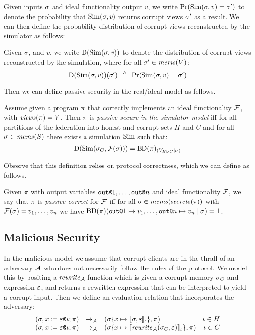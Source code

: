 Given inputs $\sigma$ and ideal
functionality output $v$, we write $ \mathrm{Pr}(\mathrm{Sim}(\sigma,v) = \sigma') $
to denote the probability that $\mathrm{Sim}(\sigma,v)$ returns corrupt views
$\sigma'$ as a result. We can then define the probability distribution
of corrupt views reconstructed by the simulator as follows:
\begin{definition}
  Given $\sigma$, and $v$, we write $\mathrm{D}(\mathrm{Sim}(\sigma,v))$ to
  denote the distribution of corrupt views reconstructed by the
  simulation, where for
  all $\sigma' \in \mathit{mems}(V)$:
  $$
  \dist(\SIM(\store,v))(\store')\ \defeq\ \prob(\SIM(\store,v) = \store') 
  $$
\end{definition}
Then we can define passive security in the real/ideal
model as follows. 
\begin{definition}
  Assume given a program $\pi$ that correctly implements an ideal
  functionality $\mathcal{F}$, with $\mathit{views}(\pi) = V$.  Then $\pi$
  is \emph{passive secure in the simulator model} iff for all
  partitions of the federation into honest and corrupt sets $H$ and $C$
  and for all $\sigma \in \mathit{mems}(S)$ there exists a
  simulation $\mathrm{Sim}$ such that:
  $$
  \mathrm{D}(\mathrm{Sim}(\sigma_{C},\mathcal{F}(\sigma))) = \mathrm{BD}(\pi)_{({V_{H \rhd C}}|{\sigma})}
  $$
\end{definition}
Observe that this definition relies on protocol correctness, which
we can define as follows.
\begin{definition}
  Given $\pi$ with output variables $\texttt{out}\texttt{@}1,\ldots,\texttt{out}\texttt{@}n$ and ideal
  functionality $\mathcal{F}$, we say that $\pi$ is \emph{passive correct}
  for $\mathcal{F}$ iff for all $\sigma \in \mathit{mems}(\mathit{secrets}(\pi))$
  with $\mathcal{F}(\sigma) = v_1,\ldots,v_n$ we have
  $\mathrm{BD}(\pi)(\texttt{out}\texttt{@}1 \mapsto v_1,\ldots,\texttt{out}\texttt{@}n \mapsto v_n \mid \sigma) = 1$.
\end{definition}

\subsection{Malicious Security}

\adversaryfig

In the malicious model we assume that corrupt clients are in the thrall of an
adversary $\mathcal{A}$ who does not necessarily follow the rules of the protocol.
We model this by positing a $\mathit{rewrite}_{\mathcal{A}}$ function which is given a corrupt memory
$\sigma_C$ and expression $\varepsilon$, and returns a rewritten expression that can
be interpreted to yield a corrupt input. Then we define an evaluation
relation that incorporates the adversary:
$$
\begin{array}{rclr}
  (\sigma, x := \varepsilon\texttt{@}\iota;\pi) &\xrightarrow{}_{\mathcal{A}}&
  (\sigma\{x \mapsto \llbracket \sigma,\varepsilon \rrbracket_{\iota}\}, \pi) & \iota \in H\\
  (\sigma, x := \varepsilon\texttt{@}\iota;\pi) &\xrightarrow{}_{\mathcal{A}}&
  (\sigma\{x \mapsto \llbracket \mathit{rewrite}_{\mathcal{A}}(\sigma_C,\varepsilon) \rrbracket_{\iota}\}, \pi) & \iota \in C
\end{array}
$$

